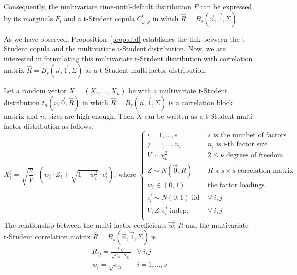 \documentclass[11pt,fleqn]{book} %
\begin{document}
Consequently, the multivariate time-until-default distribution $F$ can be 
expressed by its marginals $F_i$ and a t-Student copula 
$C_{\nu,\widehat{R}}^{\text{t}}$ in which $\widehat{R} = B_s(\vec{n},\vec{1},\Sigma)$.

As we have observed, Proposition~\ref{prop:dtd} establishes the link between 
the t-Student copula and the multivariate t-Student distribution. Now, we are
interested in formulating this multivariate t-Student distribution with 
correlation matrix $\widehat{R} = B_s(\vec{n},\vec{1},\Sigma)$ as a t-Student 
multi-factor distribution.

\begin{proposition}
	\label{prop:tmfm}
	Let a random vector $X=(X_1,\dots,X_n)$ be with a multivariate t-Student 
	distribution $t_n(\nu,\vec{0},\widehat{R})$ in which 
	$\widehat{R} = B_s(\vec{n},\vec{1},\Sigma)$ is a correlation block matrix 
	and $n_i$ sizes are high enough. Then $X$ can be written as a t-Student 
	multi-factor distribution as follows:
	\begin{displaymath}
		X_i^j = \sqrt{\frac{\nu}{V}} \cdot 
		\left( w_i \cdot Z_i + \sqrt{1-w_i^2} \cdot \epsilon_i^j \right)
		\text{, where } \left\{
		\begin{array}{ll}
			i = 1, \dots, s & \text{$s$ is the number of factors} \\
			j = 1, \dots, n_i & \text{$n_i$ is i-th factor size} \\
			V \sim \chi_{\nu}^2 & 2 \le \nu \text{ degrees of freedom} \\
			Z \sim N(\vec{0},R) & \text{$R$ a $s {\times} s$ correlation matrix} \\
			w_i \in (0,1) & \text{the factor loadings } \\
			\epsilon_i^j \sim N(0,1) \text { iid } & \forall\ i,j \\
			V, Z, \epsilon_i^j \text{ indep. } & \forall\ i,j \\
		\end{array}
		\right.
	\end{displaymath}
	The relationship between the multi-factor coefficients $\vec{w}$, $R$ 
	and the multivariate t-Student correlation matrix 
	$\widehat{R} = B_s(\vec{n},\vec{1},\Sigma)$ is
	\begin{displaymath}
		\begin{array}{ll}
			R_{ij} = \frac{\sigma_{ij}}{\sqrt{\sigma_{ii} \cdot \sigma_{jj}}} & \forall\ i,j \\
			w_i = \sqrt{\sigma_{ii}} & i = 1,\dots,s \\
		\end{array}
	\end{displaymath}
\end{proposition}
\end{document}
